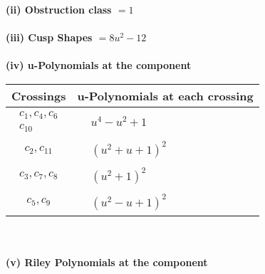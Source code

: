 \documentclass[1p]{elsarticle_modified}
\theoremstyle{definition}
\begin{document}
\flushleft \textbf{(ii) Obstruction class $= 1$}\\~\\
\flushleft \textbf{(iii) Cusp Shapes $= 8 u^2-12$}\\~\\
\newpage\renewcommand{\arraystretch}{1}
\flushleft \textbf{(iv) u-Polynomials at the component}\newline \\
\begin{tabular}{m{50pt}|m{274pt}}
Crossings & \hspace{64pt}u-Polynomials at each crossing \\
\hline $$\begin{aligned}c_{1},c_{4},c_{6}\\c_{10}\end{aligned}$$&$\begin{aligned}
&u^4- u^2+1
\end{aligned}$\\
\hline $$\begin{aligned}c_{2},c_{11}\end{aligned}$$&$\begin{aligned}
&(u^2+u+1)^2
\end{aligned}$\\
\hline $$\begin{aligned}c_{3},c_{7},c_{8}\end{aligned}$$&$\begin{aligned}
&(u^2+1)^2
\end{aligned}$\\
\hline $$\begin{aligned}c_{5},c_{9}\end{aligned}$$&$\begin{aligned}
&(u^2- u+1)^2
\end{aligned}$\\
\hline
\end{tabular}\\~\\
\newpage\renewcommand{\arraystretch}{1}
\flushleft \textbf{(v) Riley Polynomials at the component}\newline \\
\end{document}
